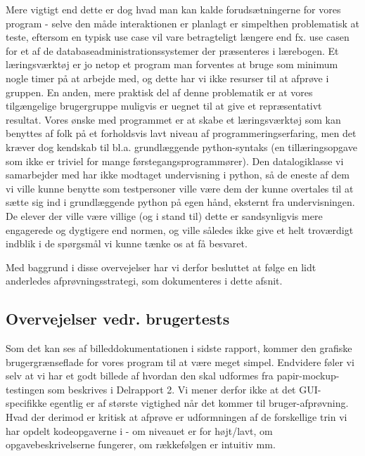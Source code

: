 \documentclass[10pt,a4paper,danish]{article}
\begin{document}
Mere vigtigt end dette er dog hvad man kan kalde forudsætningerne for vores program - selve den
måde interaktionen er planlagt er simpelthen problematisk at teste, eftersom en typisk use case
vil vare betragteligt længere end fx. use casen for et af de databaseadministrationssystemer der
præsenteres i lærebogen. Et læringsværktøj er jo netop et program man forventes at bruge som
minimum nogle timer på at arbejde med, og dette har vi ikke resurser til at afprøve i gruppen. 
En anden, mere praktisk del af denne problematik er at vores tilgængelige brugergruppe muligvis er 
uegnet til at give et repræsentativt resultat. Vores ønske med programmet er at skabe et læringsværktøj
som kan benyttes af folk på et forholdsvis lavt niveau af programmeringserfaring, men det kræver
dog kendskab til bl.a. grundlæggende python-syntaks (en tillæringsopgave som ikke er triviel for
mange førstegangsprogrammører). Den datalogiklasse vi samarbejder med har ikke modtaget undervisning
i python, så de eneste af dem vi ville kunne benytte som testpersoner ville være dem der kunne 
overtales til at sætte sig ind i grundlæggende python på egen hånd, eksternt fra undervisningen. 
De elever der ville være villige (og i stand til) dette er sandsynligvis mere engagerede og dygtigere
end normen, og ville således ikke give et helt troværdigt indblik i de spørgsmål vi kunne tænke os
at få besvaret. 

Med baggrund i disse overvejelser har vi derfor besluttet at følge en lidt anderledes afprøvningsstrategi,
som dokumenteres i dette afsnit. 

\subsection{Overvejelser vedr. brugertests}
Som det kan ses af billeddokumentationen i sidste rapport, kommer den grafiske brugergrænseflade
for vores program til at være meget simpel. Endvidere føler vi selv at vi har et godt
billede af hvordan den skal udformes fra papir-mockup-testingen som beskrives i Delrapport 2.
Vi mener derfor ikke at det GUI-specifikke egentlig er af største vigtighed når det kommer til bruger-afprøvning. 
Hvad der derimod er kritisk at afprøve er udformningen af de forskellige trin vi har opdelt 
kodeopgaverne i - om niveauet er for højt/lavt, om opgavebeskrivelserne fungerer, om rækkefølgen
er intuitiv mm. 
\end{document}

